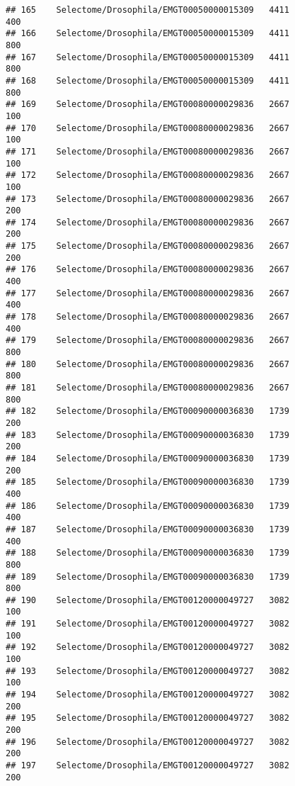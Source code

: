 \documentclass[
]{article}
\begin{document}
\begin{verbatim}
## 165    Selectome/Drosophila/EMGT00050000015309   4411                   400
## 166    Selectome/Drosophila/EMGT00050000015309   4411                   800
## 167    Selectome/Drosophila/EMGT00050000015309   4411                   800
## 168    Selectome/Drosophila/EMGT00050000015309   4411                   800
## 169    Selectome/Drosophila/EMGT00080000029836   2667                   100
## 170    Selectome/Drosophila/EMGT00080000029836   2667                   100
## 171    Selectome/Drosophila/EMGT00080000029836   2667                   100
## 172    Selectome/Drosophila/EMGT00080000029836   2667                   100
## 173    Selectome/Drosophila/EMGT00080000029836   2667                   200
## 174    Selectome/Drosophila/EMGT00080000029836   2667                   200
## 175    Selectome/Drosophila/EMGT00080000029836   2667                   200
## 176    Selectome/Drosophila/EMGT00080000029836   2667                   400
## 177    Selectome/Drosophila/EMGT00080000029836   2667                   400
## 178    Selectome/Drosophila/EMGT00080000029836   2667                   400
## 179    Selectome/Drosophila/EMGT00080000029836   2667                   800
## 180    Selectome/Drosophila/EMGT00080000029836   2667                   800
## 181    Selectome/Drosophila/EMGT00080000029836   2667                   800
## 182    Selectome/Drosophila/EMGT00090000036830   1739                   200
## 183    Selectome/Drosophila/EMGT00090000036830   1739                   200
## 184    Selectome/Drosophila/EMGT00090000036830   1739                   200
## 185    Selectome/Drosophila/EMGT00090000036830   1739                   400
## 186    Selectome/Drosophila/EMGT00090000036830   1739                   400
## 187    Selectome/Drosophila/EMGT00090000036830   1739                   400
## 188    Selectome/Drosophila/EMGT00090000036830   1739                   800
## 189    Selectome/Drosophila/EMGT00090000036830   1739                   800
## 190    Selectome/Drosophila/EMGT00120000049727   3082                   100
## 191    Selectome/Drosophila/EMGT00120000049727   3082                   100
## 192    Selectome/Drosophila/EMGT00120000049727   3082                   100
## 193    Selectome/Drosophila/EMGT00120000049727   3082                   100
## 194    Selectome/Drosophila/EMGT00120000049727   3082                   200
## 195    Selectome/Drosophila/EMGT00120000049727   3082                   200
## 196    Selectome/Drosophila/EMGT00120000049727   3082                   200
## 197    Selectome/Drosophila/EMGT00120000049727   3082                   200

\end{verbatim}
\end{document}
